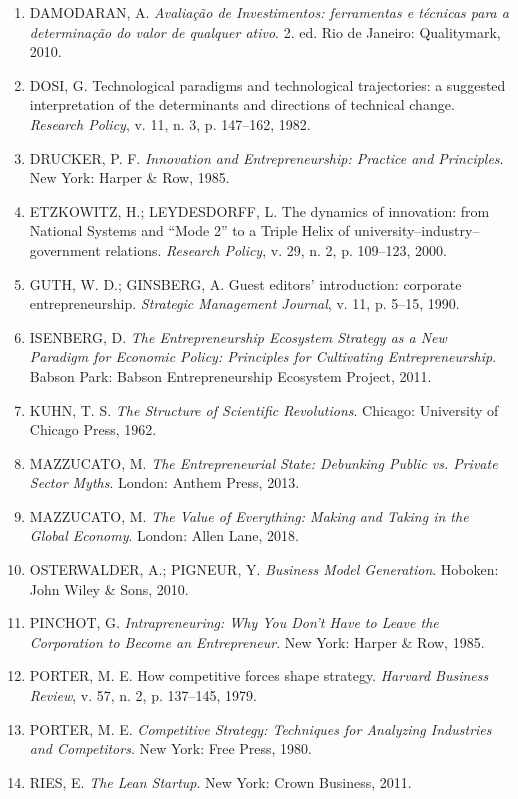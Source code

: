 \begin{enumerate}[leftmargin=1.5em, itemsep=3.5pt]
  \item DAMODARAN, A. \textit{Avaliação de Investimentos: ferramentas e técnicas para a determinação do valor de qualquer ativo}. 2. ed. Rio de Janeiro: Qualitymark, 2010.
  \item DOSI, G. Technological paradigms and technological trajectories: a suggested interpretation of the determinants and directions of technical change. \textit{Research Policy}, v. 11, n. 3, p. 147--162, 1982.
  \item DRUCKER, P. F. \textit{Innovation and Entrepreneurship: Practice and Principles}. New York: Harper \& Row, 1985.
  \item ETZKOWITZ, H.; LEYDESDORFF, L. The dynamics of innovation: from National Systems and ``Mode 2'' to a Triple Helix of university--industry--government relations. \textit{Research Policy}, v. 29, n. 2, p. 109--123, 2000.
  \item GUTH, W. D.; GINSBERG, A. Guest editors' introduction: corporate entrepreneurship. \textit{Strategic Management Journal}, v. 11, p. 5--15, 1990.
  \item ISENBERG, D. \textit{The Entrepreneurship Ecosystem Strategy as a New Paradigm for Economic Policy: Principles for Cultivating Entrepreneurship}. Babson Park: Babson Entrepreneurship Ecosystem Project, 2011.
  \item KUHN, T. S. \textit{The Structure of Scientific Revolutions}. Chicago: University of Chicago Press, 1962.
  \item MAZZUCATO, M. \textit{The Entrepreneurial State: Debunking Public vs. Private Sector Myths}. London: Anthem Press, 2013.
  \item MAZZUCATO, M. \textit{The Value of Everything: Making and Taking in the Global Economy}. London: Allen Lane, 2018.
  \item OSTERWALDER, A.; PIGNEUR, Y. \textit{Business Model Generation}. Hoboken: John Wiley \& Sons, 2010.
  \item PINCHOT, G. \textit{Intrapreneuring: Why You Don't Have to Leave the Corporation to Become an Entrepreneur}. New York: Harper \& Row, 1985.
  \item PORTER, M. E. How competitive forces shape strategy. \textit{Harvard Business Review}, v. 57, n. 2, p. 137--145, 1979.
  \item PORTER, M. E. \textit{Competitive Strategy: Techniques for Analyzing Industries and Competitors}. New York: Free Press, 1980.
  \item RIES, E. \textit{The Lean Startup}. New York: Crown Business, 2011.

\end{enumerate}
